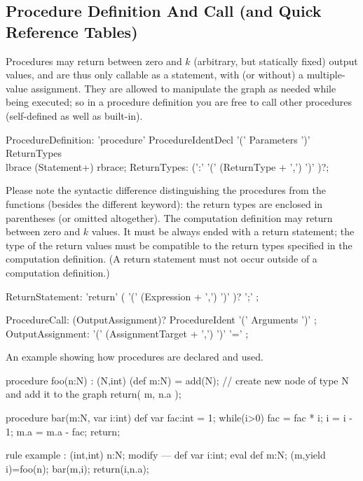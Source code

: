 \subsection{Procedure Definition And Call (and Quick Reference Tables)}\label{sub:procedures}\label{sub:proccall} 

Procedures may return between zero and $k$ (arbitrary, but statically fixed) output values, and are thus only callable as a statement, with (or without) a multiple-value assignment.
They are allowed to manipulate the graph as needed while being executed;
so in a procedure definition you are free to call other procedures (self-defined as well as built-in).

\begin{rail} 
  ProcedureDefinition: 
	'procedure' ProcedureIdentDecl '(' Parameters ')' ReturnTypes \\
	lbrace (Statement+) rbrace;
  ReturnTypes: (':' '(' (ReturnType + ',') ')' )?;
\end{rail}

Please note the syntactic difference distinguishing the procedures from the functions (besides the different keyword): the return types are enclosed in parentheses (or omitted altogether).
The computation definition may return between zero and $k$ values.
It must be always ended with a return statement; the type of the return values must be compatible to the return types specified in the computation definition.
(A return statement must not occur outside of a computation definition.)

\begin{rail}
  ReturnStatement: 'return' ( '(' (Expression + ',') ')' )? ';' ;
\end{rail}

\begin{rail}
  ProcedureCall: (OutputAssignment)? ProcedureIdent '(' Arguments ')' ;
  OutputAssignment: '(' (AssignmentTarget + ',') ')' '=' ;
\end{rail}

\begin{example}
An example showing how procedures are declared and used.
  \begin{grgen}
procedure foo(n:N) : (N,int)
{
	(def m:N) = add(N); // create new node of type N and add it to the graph
	return( m, n.a );
}

procedure bar(m:N, var i:int)
{
	def var fac:int = 1;
	while(i>0) {
		fac = fac * i;
		i = i - 1;
	}
	m.a = m.a - fac;
	return;
}

rule example : (int,int)
{
	n:N;
	modify {
	---
		def var i:int;
		eval {
			def m:N;
			(m,yield i)=foo(n);
			bar(m,i);
		}
		return(i,n.a);
	}
}
  \end{grgen}
\end{example}

